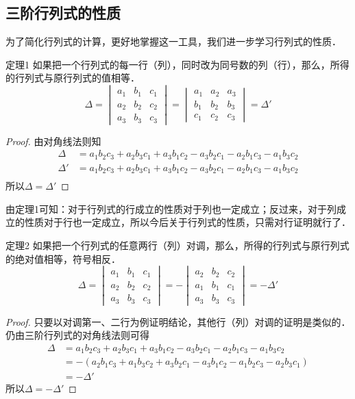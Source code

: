 \subsection{三阶行列式的性质}

为了简化行列式的计算，更好地掌握这一工具，我们进一步学习行列式的性质．

\begin{blk}{定理1 }
    如果把一个行列式的每一行（列），同时改为同号数的列（行），那么，所得的行列式与原行列式的值相等．
\[\Delta=\begin{vmatrix}
    a_1&b_1&c_1\\a_2&b_2&c_2\\a_3&b_3&c_3
\end{vmatrix}=\begin{vmatrix}
    a_1&a_2&a_3\\b_1&b_2&b_3\\c_1&c_2&c_3
\end{vmatrix}=\Delta'\]
\end{blk}

 \begin{proof}
由对角线法则知    
\[\begin{split}
    \Delta &=a_1b_2c_3+a_2b_3c_1+a_3b_1c_2-a_3b_2c_1-a_2b_1c_3-a_1b_3c_2\\
    \Delta'&=a_1b_2c_3+a_2b_3c_1+a_3b_1c_2-a_3b_2c_1-a_2b_1c_3-a_1b_3c_2\\
\end{split}\]
所以$\Delta=\Delta'$
 \end{proof}


 由定理1可知：对于行列式的行成立的性质对于列也一定成立；反过来，对于列成立的性质对于行也一定成立，所以今后关于行列式的性质，只需对行证明就行了．

\begin{blk}{定理2}
    如果把一个行列式的任意两行（列）对调，那么，所得的行列式与原行列式的绝对值相等，符号相反．
    \[\Delta=\begin{vmatrix}
        a_1&b_1&c_1\\a_2&b_2&c_2\\a_3&b_3&c_3
    \end{vmatrix}=-\begin{vmatrix}
        a_2&b_2&c_2\\a_1&b_1&c_1\\a_3&b_3&c_3
    \end{vmatrix}=-\Delta'\]
\end{blk} 

\begin{proof}
    只要以对调第一、二行为例证明结论，其他行（列）对调的证明是类似的．
    仍由三阶行列式的对角线法则可得
    \[\begin{split}
        \Delta&=a_1b_2c_3+a_2b_3c_1+a_3b_1c_2-a_3b_2c_1-a_2b_1c_3-a_1b_3c_2\\
        &=-(a_2b_1c_3+a_1b_3c_2+a_3b_2c_1-a_3b_1c_2-a_1b_2c_3-a_2b_3c_1)\\
        &=-\Delta'
    \end{split}\]
    所以$\Delta=-\Delta'$
\end{proof}

